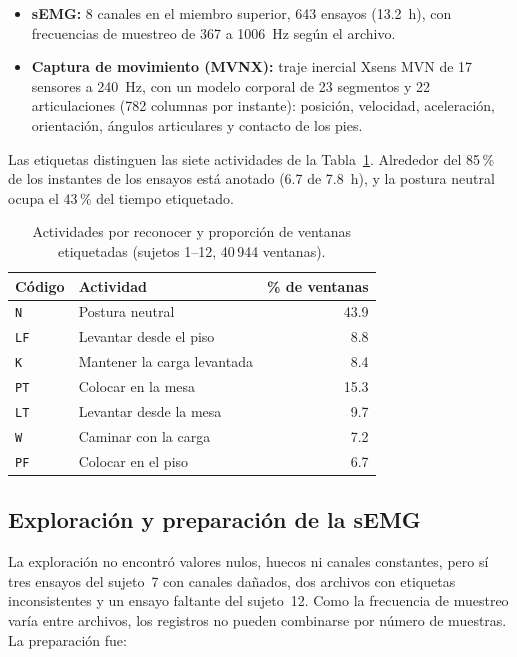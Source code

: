 \documentclass[letterpaper,11pt]{article}
\newcommand{\act}[1]{\texttt{#1}}
\begin{document}
\begin{itemize}
  \item \textbf{sEMG:} 8 canales en el miembro superior, 643 ensayos (13.2~h), con frecuencias de muestreo de 367 a 1006~Hz según el archivo.
  \item \textbf{Captura de movimiento (MVNX):} traje inercial Xsens MVN de 17 sensores a 240~Hz, con un modelo corporal de 23 segmentos y 22 articulaciones (782 columnas por instante): posición, velocidad, aceleración, orientación, ángulos articulares y contacto de los pies.
\end{itemize}

Las etiquetas distinguen las siete actividades de la Tabla~\ref{tab:clases}. Alrededor del 85\,\% de los instantes de los ensayos está anotado (6.7 de 7.8~h), y la postura neutral ocupa el 43\,\% del tiempo etiquetado.

\begin{table}[H]
  \centering
  \small
  \caption{Actividades por reconocer y proporción de ventanas etiquetadas (sujetos 1--12, 40\,944 ventanas).}
  \label{tab:clases}
  \begin{tabular}{llr}
    \toprule
    Código & Actividad & \% de ventanas \\
    \midrule
    \act{N}  & Postura neutral              & 43.9 \\
    \act{LF} & Levantar desde el piso       & 8.8 \\
    \act{K}  & Mantener la carga levantada  & 8.4 \\
    \act{PT} & Colocar en la mesa           & 15.3 \\
    \act{LT} & Levantar desde la mesa       & 9.7 \\
    \act{W}  & Caminar con la carga         & 7.2 \\
    \act{PF} & Colocar en el piso           & 6.7 \\
    \bottomrule
  \end{tabular}
\end{table}

\subsection{Exploración y preparación de la sEMG}
La exploración no encontró valores nulos, huecos ni canales constantes, pero sí tres ensayos del sujeto~7 con canales dañados, dos archivos con etiquetas inconsistentes y un ensayo faltante del sujeto~12. Como la frecuencia de muestreo varía entre archivos, los registros no pueden combinarse por número de muestras. La preparación fue:
\end{document}
